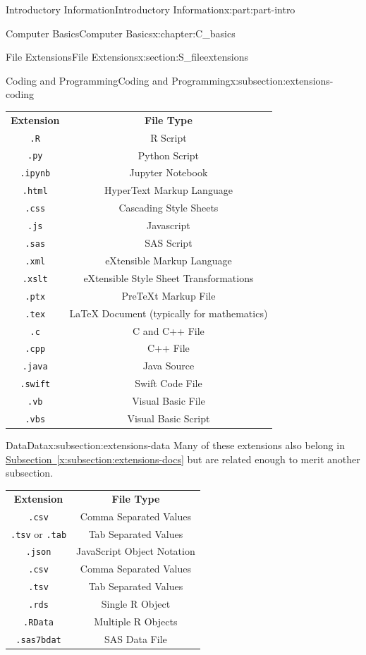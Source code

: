 \documentclass[oneside,10pt,]{book}
\newcommand{\tabularfont}{\relax}
\newcommand{\xreffont}{\relax}
\newcommand{\mono}[1]{\texttt{#1}}
\begin{document}
\begin{partptx}{Introductory Information}{}{Introductory Information}{}{}{x:part:part-intro}
\begin{chapterptx}{Computer Basics}{}{Computer Basics}{}{}{x:chapter:C_basics}
\begin{sectionptx}{File Extensions}{}{File Extensions}{}{}{x:section:S_fileextensions}
\begin{subsectionptx}{Coding and Programming}{}{Coding and Programming}{}{}{x:subsection:extensions-coding}
\begin{center}%
{\tabularfont%
\begin{tabular}{cc}
\textbf{Extension}&\textbf{File Type}\tabularnewline[0pt]
\mono{.R}&R Script\tabularnewline[0pt]
\mono{.py}&Python Script\tabularnewline[0pt]
\mono{.ipynb}&Jupyter Notebook\tabularnewline[0pt]
\mono{.html}&HyperText Markup Language\tabularnewline[0pt]
\mono{.css}&Cascading Style Sheets\tabularnewline[0pt]
\mono{.js}&Javascript\tabularnewline[0pt]
\mono{.sas}&SAS Script\tabularnewline[0pt]
\mono{.xml}&eXtensible Markup Language\tabularnewline[0pt]
\mono{.xslt}&eXtensible Style Sheet Transformations\tabularnewline[0pt]
\mono{.ptx}&PreTeXt Markup File\tabularnewline[0pt]
\mono{.tex}&LaTeX Document (typically for mathematics)\tabularnewline[0pt]
\mono{.c}&C and C++ File\tabularnewline[0pt]
\mono{.cpp}&C++ File\tabularnewline[0pt]
\mono{.java}&Java Source\tabularnewline[0pt]
\mono{.swift}&Swift Code File\tabularnewline[0pt]
\mono{.vb}&Visual Basic File\tabularnewline[0pt]
\mono{.vbs}&Visual Basic Script
\end{tabular}
}%
\end{center}%
\end{subsectionptx}
%
%
\typeout{************************************************}
\typeout{************************************************}
%
\begin{subsectionptx}{Data}{}{Data}{}{}{x:subsection:extensions-data}
%
Many of these extensions also belong in \hyperref[x:subsection:extensions-docs]{Subsection~{\xreffont\ref{x:subsection:extensions-docs}}} but are related enough to merit another subsection.%
\begin{center}%
{\tabularfont%
\begin{tabular}{cc}
\textbf{Extension}&\textbf{File Type}\tabularnewline[0pt]
\mono{.csv}&Comma Separated Values\tabularnewline[0pt]
\mono{.tsv} or \mono{.tab}&Tab Separated Values\tabularnewline[0pt]
\mono{.json}&JavaScript Object Notation\tabularnewline[0pt]
\mono{.csv}&Comma Separated Values\tabularnewline[0pt]
\mono{.tsv}&Tab Separated Values\tabularnewline[0pt]
\mono{.rds}&Single R Object\tabularnewline[0pt]
\mono{.RData}&Multiple R Objects\tabularnewline[0pt]
\mono{.sas7bdat}&SAS Data File
\end{tabular}
}%
\end{center}%
\end{subsectionptx}
%
%
\typeout{************************************************}
\typeout{************************************************}

\end{sectionptx}
\end{chapterptx}
\end{partptx}
\end{document}

